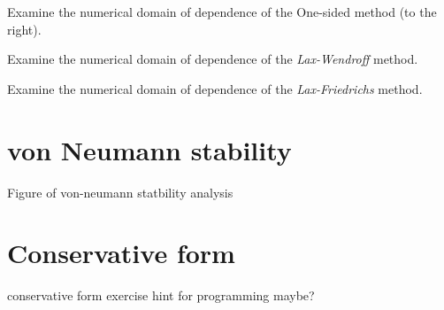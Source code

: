 \documentclass[12pt]{article}
\begin{document}
\pagebreak
\begin{example}
	Examine the numerical domain of dependence of the One-sided method (to the right).
\end{example}

\pagebreak
\begin{example}
	Examine the numerical domain of dependence of the \emph{Lax-Wendroff} method.
\end{example}

\pagebreak
\begin{example}
	Examine the numerical domain of dependence of the \emph{Lax-Friedrichs} method.
\end{example}

\section{von Neumann stability}
Figure of von-neumann statbility analysis

\section{Conservative form}
conservative form exercise
hint for programming maybe?



\end{document}
